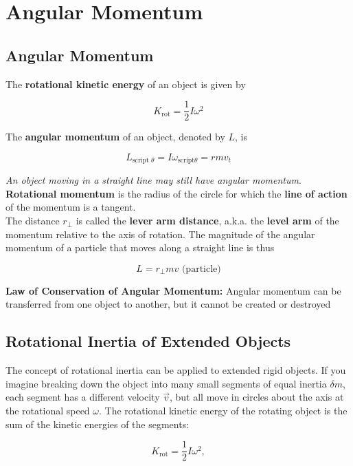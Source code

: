 \section{Angular Momentum}

    \subsection{Angular Momentum}

        The \textbf{rotational kinetic energy} of an object is given by

        \[
            K_{\text{rot}} = \frac{1}{2}I\omega^2
        \]

        The \textbf{angular momentum} of an object, denoted by $L$, is

        \[
            L_{\text{script } \theta} = I \omega_{\text{script} \theta} = rmv_t
        \]

        \textit{An object moving in a straight line may still have angular momentum}. \textbf{Rotational momentum} is the radius of the circle for which the \textbf{line of action} of the momentum is a tangent. \\
        The distance $r_{\bot}$ is called the \textbf{lever arm distance}, a.k.a. the \textbf{level arm} of the momentum relative to the axis of rotation. The magnitude of the angular momentum of a particle that moves
        along a straight line is thus

        \[
            L = r_{\bot} mv \text{ (particle)}
        \]

        \textbf{Law of Conservation of Angular Momentum:} Angular momentum can be transferred from one object to another, but it cannot be created or destroyed


    \subsection{Rotational Inertia of Extended Objects}

        The concept of rotational inertia can be applied to extended rigid objects. If you imagine breaking down the object into many small segments of equal inertia $\delta m$, each segment has a different velocity
        $\vec{v}$, but all move in circles about the axis at the rotational speed $\omega$. The rotational kinetic energy of the rotating object is the sum of the kinetic energies of the segments:

        \[
            K_{\text{rot}} = \frac{1}{2}I\omega^2,
        \]

